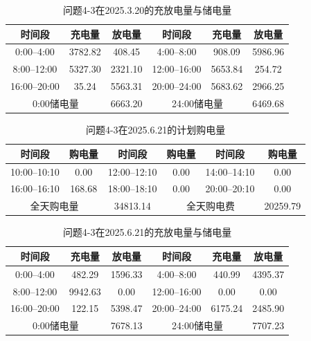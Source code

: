 \documentclass[UTF8]{ctexart}
\begin{document}
    \begin{table}[htbp]
        \centering
        \caption{问题4-3在2025.3.20的充放电量与储电量}
        \label{tab:q43_battery_0320}
        \begin{tabular}{cccccc}
            \toprule
            时间段 & 充电量 & 放电量 & 时间段 & 充电量 & 放电量 \\
            \midrule
            0:00--4:00 & 3782.82 & 408.45 & 4:00--8:00 & 908.09 & 5986.96 \\
            8:00--12:00 & 5327.30 & 2321.10 & 12:00--16:00 & 5653.84 & 254.72 \\
            16:00--20:00 & 35.24 & 5563.31 & 20:00--24:00 & 5683.62 & 2966.25 \\
            \midrule
            \multicolumn{2}{c}{0:00储电量} & 6663.20 &
            \multicolumn{2}{c}{24:00储电量} & 6469.68 \\
            \bottomrule
        \end{tabular}
    \end{table}
    
    \begin{table}[htbp]
        \centering
        \caption{问题4-3在2025.6.21的计划购电量}
        \label{tab:q43_tenminute_0621}
        \begin{tabular}{cccccc}
            \toprule
            时间段 & 购电量 & 时间段 & 购电量 & 时间段 & 购电量 \\
            \midrule
            10:00--10:10 & 0.00 & 12:00--12:10 & 0.00 & 14:00--14:10 & 0.00 \\
            16:00--16:10 & 168.68 & 18:00--18:10 & 0.00 & 20:00--20:10 & 0.00 \\
            \midrule
            \multicolumn{2}{c}{全天购电量} & 34813.14 &
            \multicolumn{2}{c}{全天购电费} & 20259.79 \\
            \bottomrule
        \end{tabular}
    \end{table}
    
    \begin{table}[htbp]
        \centering
        \caption{问题4-3在2025.6.21的充放电量与储电量}
        \label{tab:q43_battery_0621}
        \begin{tabular}{cccccc}
            \toprule
            时间段 & 充电量 & 放电量 & 时间段 & 充电量 & 放电量 \\
            \midrule
            0:00--4:00 & 482.29 & 1596.33 & 4:00--8:00 & 440.99 & 4395.37 \\
            8:00--12:00 & 9942.63 & 0.00 & 12:00--16:00 & 0.00 & 0.00 \\
            16:00--20:00 & 122.15 & 5398.47 & 20:00--24:00 & 6175.24 & 2485.90 \\
            \midrule
            \multicolumn{2}{c}{0:00储电量} & 7678.13 &
            \multicolumn{2}{c}{24:00储电量} & 7707.23 \\
            \bottomrule
        \end{tabular}
    \end{table}
    
\end{document}
